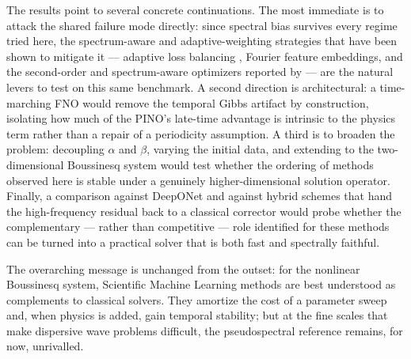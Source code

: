 The results point to several concrete continuations. The most immediate is to attack the shared failure mode directly: since spectral bias survives every regime tried here, the spectrum-aware and adaptive-weighting strategies that have been shown to mitigate it --- adaptive loss balancing \parencite{wang2021understanding}, Fourier feature embeddings, and the second-order and spectrum-aware optimizers reported by \textcite{khodakarami2026} --- are the natural levers to test on this same benchmark. A second direction is architectural: a time-marching FNO would remove the temporal Gibbs artifact by construction, isolating how much of the PINO's late-time advantage is intrinsic to the physics term rather than a repair of a periodicity assumption. A third is to broaden the problem: decoupling $\alpha$ and $\beta$, varying the initial data, and extending to the two-dimensional Boussinesq system would test whether the ordering of methods observed here is stable under a genuinely higher-dimensional solution operator. Finally, a comparison against DeepONet \parencite{lu2021deeponet} and against hybrid schemes that hand the high-frequency residual back to a classical corrector would probe whether the complementary --- rather than competitive --- role identified for these methods can be turned into a practical solver that is both fast and spectrally faithful.

The overarching message is unchanged from the outset: for the nonlinear Boussinesq system, Scientific Machine Learning methods are best understood as complements to classical solvers. They amortize the cost of a parameter sweep and, when physics is added, gain temporal stability; but at the fine scales that make dispersive wave problems difficult, the pseudospectral reference remains, for now, unrivalled.
